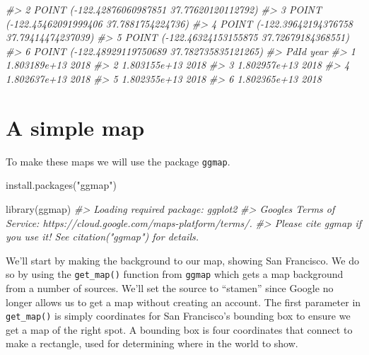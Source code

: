 \documentclass[
]{krantz}
\makeatletter
\newenvironment{Shaded}{\begin{snugshade}}{\end{snugshade}}
\newcommand{\CommentTok}[1]{\textcolor[rgb]{0.37,0.37,0.37}{\textit{#1}}}
\newcommand{\FunctionTok}[1]{\textcolor[rgb]{0,0,0}{#1}}
\newcommand{\NormalTok}[1]{#1}
\newcommand{\StringTok}[1]{\textcolor[rgb]{0.5,0.5,0.5}{#1}}
\newenvironment{kframe}{%
\medskip{}
\setlength{\fboxsep}{.8em}
 \def\at@end@of@kframe{}%
 \ifinner\ifhmode%
  \def\at@end@of@kframe{\end{minipage}}%
  \begin{minipage}{\columnwidth}%
 \fi\fi%
 \def\FrameCommand##1{\hskip\@totalleftmargin \hskip-\fboxsep
 \colorbox{shadecolor}{##1}\hskip-\fboxsep
     \hskip-\linewidth \hskip-\@totalleftmargin \hskip\columnwidth}%
 \MakeFramed {\advance\hsize-\width
   \@totalleftmargin\z@ \linewidth\hsize
   \@setminipage}}%
 {\par\unskip\endMakeFramed%
 \at@end@of@kframe}
\renewenvironment{Shaded}{\begin{kframe}}{\end{kframe}}
\makeatother
\begin{document}
\begin{Shaded}
\begin{Highlighting}[]
\CommentTok{\#\textgreater{} 2  POINT ({-}122.42876060987851 37.77620120112792)}
\CommentTok{\#\textgreater{} 3   POINT ({-}122.45462091999406 37.7881754224736)}
\CommentTok{\#\textgreater{} 4  POINT ({-}122.39642194376758 37.79414474237039)}
\CommentTok{\#\textgreater{} 5  POINT ({-}122.46324153155875 37.72679184368551)}
\CommentTok{\#\textgreater{} 6 POINT ({-}122.48929119750689 37.782735835121265)}
\CommentTok{\#\textgreater{}           PdId year}
\CommentTok{\#\textgreater{} 1 1.803189e+13 2018}
\CommentTok{\#\textgreater{} 2 1.803155e+13 2018}
\CommentTok{\#\textgreater{} 3 1.802957e+13 2018}
\CommentTok{\#\textgreater{} 4 1.802637e+13 2018}
\CommentTok{\#\textgreater{} 5 1.802355e+13 2018}
\CommentTok{\#\textgreater{} 6 1.802365e+13 2018}
\end{Highlighting}
\end{Shaded}

\hypertarget{a-simple-map}{%
\section{A simple map}\label{a-simple-map}}

To make these maps we will use the package \texttt{ggmap}.

\begin{Shaded}
\begin{Highlighting}[]
\FunctionTok{install.packages}\NormalTok{(}\StringTok{"ggmap"}\NormalTok{)}
\end{Highlighting}
\end{Shaded}

\begin{Shaded}
\begin{Highlighting}[]
\FunctionTok{library}\NormalTok{(ggmap)}
\CommentTok{\#\textgreater{} Loading required package: ggplot2}
\CommentTok{\#\textgreater{} Google\textquotesingle{}s Terms of Service: https://cloud.google.com/maps{-}platform/terms/.}
\CommentTok{\#\textgreater{} Please cite ggmap if you use it! See citation("ggmap") for details.}
\end{Highlighting}
\end{Shaded}

We'll start by making the background to our map, showing San Francisco. We do so by using the \texttt{get\_map()} function from \texttt{ggmap} which gets a map background from a number of sources. We'll set the source to ``stamen'' since Google no longer allows us to get a map without creating an account. The first parameter in \texttt{get\_map()} is simply coordinates for San Francisco's bounding box to ensure we get a map of the right spot. A bounding box is four coordinates that connect to make a rectangle, used for determining where in the world to show.
\end{document}
